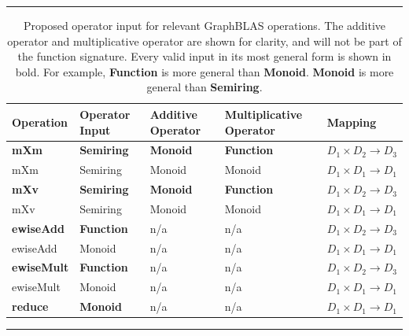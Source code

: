 \documentclass[11pt]{extarticle}
\begin{document}
\begin{table}
\hrule
\begin{center}
\caption{Proposed operator input for relevant GraphBLAS operations. The additive operator and multiplicative operator are shown for clarity, and will not be part of the function signature. Every valid input in its most general form is shown in bold. For example, \textbf{Function} is more general than \textbf{Monoid}. \textbf{Monoid} is more general than \textbf{Semiring}.}
\label{Tab:OperatorInputType}
\begin{tabular}{l|l|l|l|l}
Operation	& Operator Input & Additive Operator & Multiplicative Operator & Mapping \\ \hline
\textbf{mXm} & \textbf{Semiring} & \textbf{Monoid} & \textbf{Function} & $D_1 \times D_2 \rightarrow D_3$\\
mXm	 & Semiring & Monoid & Monoid & $D_1 \times D_1 \rightarrow D_1$\\
\textbf{mXv} & \textbf{Semiring} & \textbf{Monoid} & \textbf{Function} & $D_1 \times D_2 \rightarrow D_3$ \\
mXv & Semiring & Monoid & Monoid & $D_1 \times D_1 \rightarrow D_1$ \\
\textbf{ewiseAdd} &  \textbf{Function} & n/a & n/a & $D_1 \times D_2 \rightarrow D_3$ \\
ewiseAdd & Monoid & n/a & n/a & $D_1 \times D_1 \rightarrow D_1$ \\
\textbf{ewiseMult} & \textbf{Function} & n/a & n/a & $D_1 \times D_2 \rightarrow D_3$ \\
ewiseMult & Monoid & n/a & n/a & $D_1 \times D_1 \rightarrow D_1$ \\
\textbf{reduce} & \textbf{Monoid} & n/a & n/a & $D_1 \times D_1 \rightarrow D_1$\\
\end{tabular}
\end{center}
\hrule
\end{table}
\end{document}

